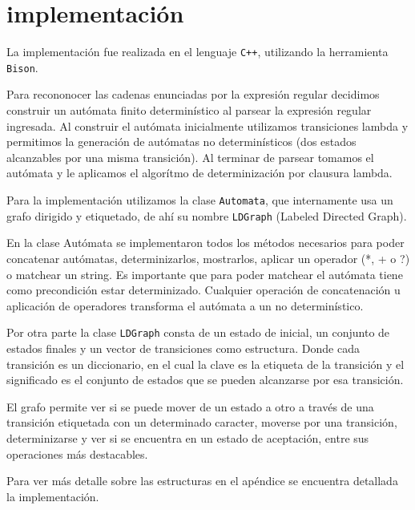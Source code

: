\section{implementación}

La implementación fue realizada en el lenguaje \texttt{C++}, utilizando la herramienta \texttt{Bison}. 

Para recononocer las cadenas enunciadas por la expresión regular decidimos construir 
un autómata finito determinístico al parsear la expresión regular ingresada.
Al construir el autómata inicialmente utilizamos transiciones lambda y permitimos 
la generación de autómatas no determinísticos (dos estados alcanzables por una misma
transición). Al terminar de parsear tomamos el autómata y le aplicamos el algorítmo
de determinización por clausura lambda. 

Para la implementación utilizamos la clase \texttt{Automata}, que internamente usa un 
grafo dirigido y etiquetado, de ahí su nombre \texttt{LDGraph} (Labeled Directed Graph).

En la clase Autómata se implementaron todos los métodos necesarios para poder 
concatenar autómatas, determinizarlos, mostrarlos, aplicar un operador (*, + o ?) 
o matchear un string. Es importante que para poder matchear el autómata tiene como
precondición estar determinizado. Cualquier operación de concatenación u 
aplicación de operadores transforma el autómata a un no determinístico.

Por otra parte la clase \texttt{LDGraph} consta de un estado de inicial, un conjunto de 
estados finales y un vector de transiciones como estructura. Donde cada transición
es un diccionario, en el cual la clave es la etiqueta de la transición y el 
significado es el conjunto de estados que se pueden alcanzarse por esa transición.

El grafo permite ver si se puede mover de un estado a otro a través de una transición
etiquetada con un determinado caracter, moverse por una transición, determinizarse
y ver si se encuentra en un estado de aceptación, entre sus operaciones más destacables.

Para ver más detalle sobre las estructuras en el apéndice se encuentra detallada 
la implementación.
